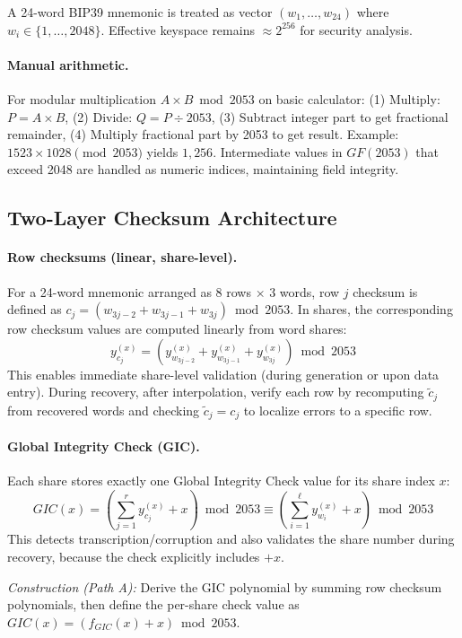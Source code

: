 \documentclass[11pt]{article}
\begin{document}
A 24-word BIP39 mnemonic is treated as vector $(w_1, \ldots, w_{24})$ where $w_i \in \{1, \ldots, 2048\}$. Effective keyspace remains $\approx 2^{256}$ for security analysis.

\paragraph{Manual arithmetic.} For modular multiplication $A \times B \bmod 2053$ on basic calculator: (1) Multiply: $P = A \times B$, (2) Divide: $Q = P \div 2053$, (3) Subtract integer part to get fractional remainder, (4) Multiply fractional part by 2053 to get result. Example: $1523 \times 1028 \pmod{2053}$ yields $1{,}256$. Intermediate values in $GF(2053)$ that exceed 2048 are handled as numeric indices, maintaining field integrity.

\subsection{Two-Layer Checksum Architecture}
\label{sec:checksums}

\paragraph{Row checksums (linear, share-level).} For a 24-word mnemonic arranged as 8 rows $\times$ 3 words, row $j$ checksum is defined as $c_j = (w_{3j-2} + w_{3j-1} + w_{3j}) \bmod 2053$. In shares, the corresponding row checksum values are computed linearly from word shares:
\[
y_{c_j}^{(x)} = \left(y_{w_{3j-2}}^{(x)} + y_{w_{3j-1}}^{(x)} + y_{w_{3j}}^{(x)}\right) \bmod 2053
\]
This enables immediate share-level validation (during generation or upon data entry). During recovery, after interpolation, verify each row by recomputing $\tilde{c}_j$ from recovered words and checking $\tilde{c}_j = c_j$ to localize errors to a specific row.

\paragraph{Global Integrity Check (GIC).} Each share stores exactly one Global Integrity Check value for its share index $x$:
\[
GIC(x) = \left(\sum_{j=1}^{r} y_{c_j}^{(x)} + x\right) \bmod 2053 \equiv \left(\sum_{i=1}^{\ell} y_{w_i}^{(x)} + x\right) \bmod 2053
\]
This detects transcription/corruption and also validates the share number during recovery, because the check explicitly includes $+x$.

\textit{Construction (Path A):} Derive the GIC polynomial by summing row checksum polynomials, then define the per-share check value as $GIC(x) = (f_{GIC}(x) + x) \bmod 2053$.
\end{document}
